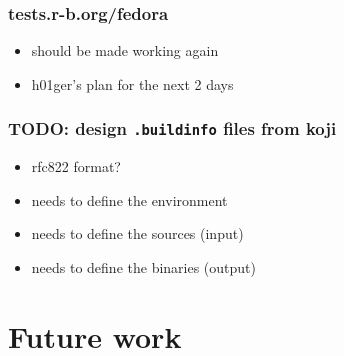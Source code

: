 \documentclass[14pt]{beamer}
\begin{document}
\begin{frame}
 \frametitle{tests.r-b.org/fedora}
 \begin{itemize}
  \item should be made working again
  \item h01ger's plan for the next 2 days
  \end{itemize}
\end{frame}

\begin{frame}
 \frametitle{TODO: design \texttt{.buildinfo} files from koji}
 \begin{itemize}
  \item rfc822 format?
  \item needs to define the environment
  \item needs to define the sources (input)
  \item needs to define the binaries (output)
 \end{itemize}
\end{frame}


\section{Future work}
\end{document}
